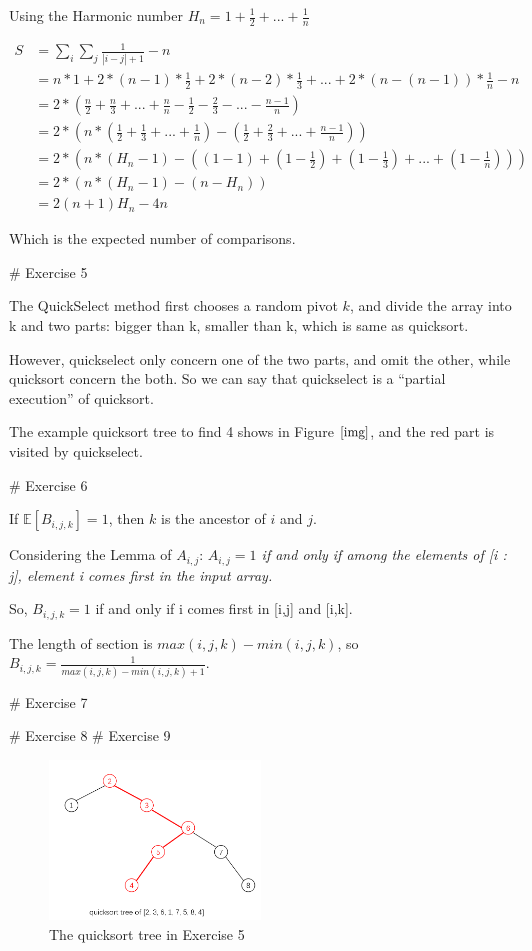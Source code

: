 \documentclass{article}
\begin{document}
Using the Harmonic number $H_{n} = 1+ \frac{1}{2} + ... + \frac{1}{n}$

\begin{align*}
 S  &= \sum_{i}\sum_{j} \frac{1}{|i-j| + 1} - n\\
    &= n*1 + 2*(n-1)*\frac{1}{2} + 2*(n-2)*\frac{1}{3} + ... + 2*(n-(n-1))*\frac{1}{n} - n\\
    &= 2*(\frac{n}{2} + \frac{n}{3} + ... + \frac{n}{n} -\frac{1}{2} - \frac{2}{3} - ... - \frac{n-1}{n})\\
    &= 2*( n*(\frac{1}{2} + \frac{1}{3} + ... + \frac{1}{n}) - (\frac{1}{2} + \frac{2}{3} + ... + \frac{n-1}{n}) )\\
    &= 2*( n*(H_{n} - 1) - ((1-1) +  (1-\frac{1}{2}) + (1 - \frac{1}{3}) + ... + (1-\frac{1}{n}) ) )\\
    &= 2*( n*(H_{n} - 1) - (n - H_{n}) )\\
    &= 2(n+1)H_{n} - 4n 
\end{align*}

Which is the expected number of comparisons.

# Exercise 5

The QuickSelect method first chooses a random pivot $k$, and divide the array into k and two parts: bigger than k, smaller than k, which is same as quicksort.

However, quickselect only concern one of the two parts, and omit the other, while quicksort concern the both. So we can say that quickselect is a “partial execution” of quicksort.

The example quicksort tree to find 4 shows in Figure $\ref{img}$, and the red part is visited by quickselect.




# Exercise 6

If $\mathds{E}[ B_{i,j,k}] = 1$, then $k$ is the ancestor of $i$ and $j$.

Considering the Lemma of $A_{i,j}$: \textit{ $A_{i,j} = 1$ if and only if among the elements of
[i : j], element i comes first in the input array.}

So, $B_{i,j,k} = 1$ if and only if i comes first in [i,j] and [i,k].

The length of section is $max(i,j,k) - min(i,j,k)$, so $B_{i,j,k} = \frac{1}{max(i,j,k) - min(i,j,k) + 1}$.

# Exercise 7






# Exercise 8
# Exercise 9

\begin{figure}
		\centering
		\includegraphics[width=0.5\textwidth]{1.png}
		\caption{
		The quicksort tree in Exercise 5} 
		\label{img}
	\end{figure}
\end{document}
